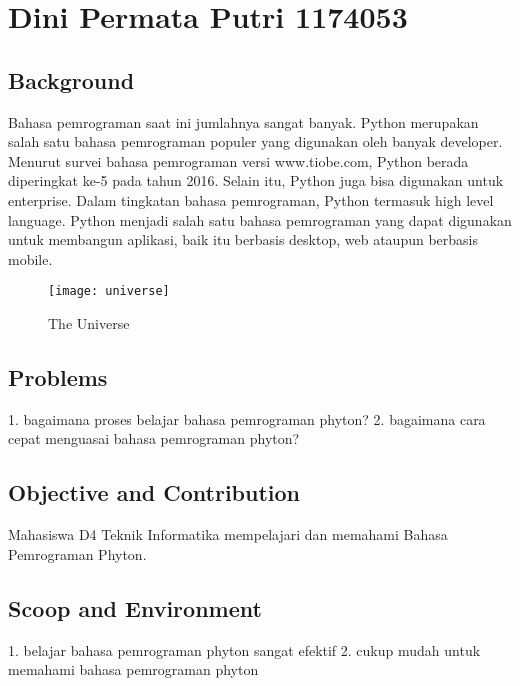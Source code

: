 \section{Dini Permata Putri 1174053}
\subsection{Background}
Bahasa pemrograman saat ini jumlahnya sangat banyak. Python merupakan salah satu bahasa
pemrograman populer yang digunakan oleh banyak developer. Menurut survei bahasa pemrograman
versi www.tiobe.com, Python berada diperingkat ke-5 pada tahun 2016. Selain itu, Python juga bisa
digunakan untuk enterprise. Dalam tingkatan bahasa pemrograman, Python termasuk high level
language. Python menjadi salah satu bahasa pemrograman yang dapat digunakan untuk membangun
aplikasi, baik itu berbasis desktop, web ataupun berbasis mobile.


\begin{figure}[h!]
\centering
\texttt{[image: universe]}
\caption{The Universe}
\label{fig:universe}
\end{figure}

\subsection{Problems}
1. bagaimana proses belajar bahasa pemrograman phyton?
2. bagaimana cara cepat menguasai bahasa pemrograman phyton?

\subsection{Objective and Contribution}
Mahasiswa D4 Teknik Informatika mempelajari dan memahami Bahasa Pemrograman Phyton.

\subsection{Scoop and Environment}
1. belajar bahasa pemrograman phyton sangat efektif
2. cukup mudah untuk memahami bahasa pemrograman phyton




